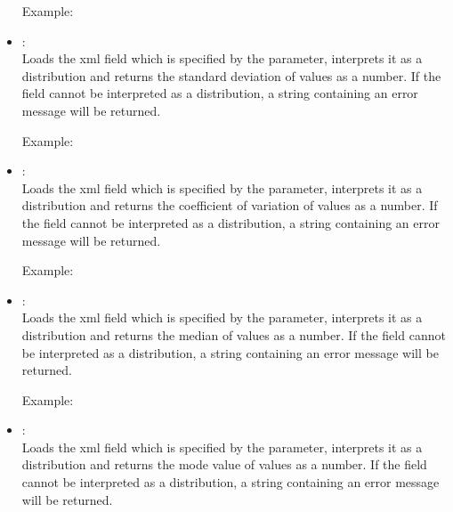 \begin{itemize}
Example:\\
  
\item
{}:\\
Loads the xml field which is specified by the parameter, interprets it as a distribution and
returns the standard deviation of values as a number.
If the field cannot be interpreted as a distribution, a string containing an error message will be returned.

Example:\\

\item
{}:\\
Loads the xml field which is specified by the parameter, interprets it as a distribution and
returns the coefficient of variation of values as a number.
If the field cannot be interpreted as a distribution, a string containing an error message will be returned.
	
Example:\\

\item
{}:\\
Loads the xml field which is specified by the parameter, interprets it as a distribution and
returns the median of values as a number.
If the field cannot be interpreted as a distribution, a string containing an error message will be returned.
	
Example:\\

\item
{}:\\
Loads the xml field which is specified by the parameter, interprets it as a distribution and
returns the mode value of values as a number.
If the field cannot be interpreted as a distribution, a string containing an error message will be returned.
	

\end{itemize}
